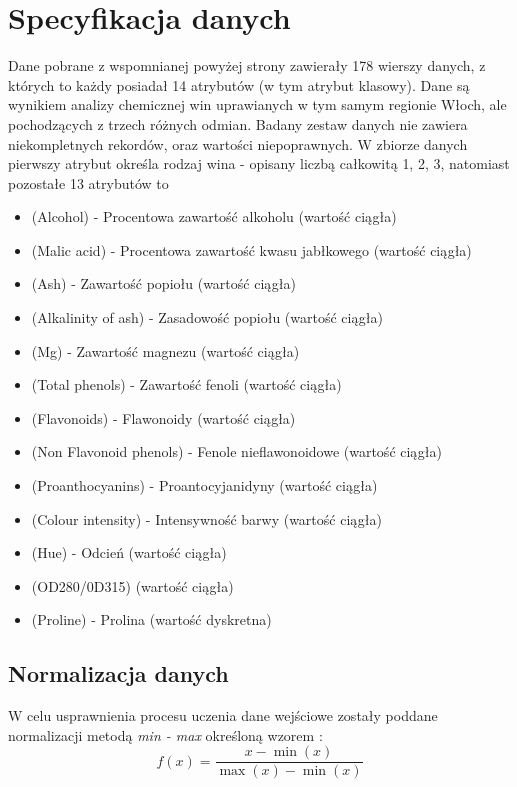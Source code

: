 \documentclass[12pt,twoside]{article}
\begin{document}
\section{Specyfikacja danych}
Dane pobrane z wspomnianej powyżej strony zawierały 178 wierszy danych, z których to każdy posiadał 14 atrybutów (w tym atrybut klasowy). Dane
są wynikiem analizy chemicznej win uprawianych w tym samym regionie Włoch,
ale pochodzących z trzech różnych odmian. Badany zestaw danych nie zawiera
niekompletnych rekordów, oraz wartości niepoprawnych. W zbiorze danych pierwszy
atrybut określa rodzaj wina - opisany liczbą całkowitą {1, 2, 3}, natomiast pozostałe
13 atrybutów to
\begin{itemize}
\item (Alcohol) - Procentowa zawartość alkoholu (wartość ciągła)
\item (Malic acid) - Procentowa zawartość kwasu jabłkowego (wartość ciągła)
\item (Ash) - Zawartość popiołu (wartość ciągła)
\item (Alkalinity of ash) - Zasadowość popiołu (wartość ciągła)
\item (Mg) - Zawartość magnezu (wartość ciągła)
\item (Total phenols) - Zawartość fenoli (wartość ciągła)
\item (Flavonoids) - Flawonoidy (wartość ciągła)
\item (Non Flavonoid phenols) - Fenole nieflawonoidowe (wartość ciągła)
\item (Proanthocyanins) - Proantocyjanidyny (wartość ciągła)
\item (Colour intensity) - Intensywność barwy (wartość ciągła)
\item (Hue) - Odcień (wartość ciągła)
\item (OD280/0D315) (wartość ciągła)
\item (Proline) - Prolina (wartość dyskretna)
\end{itemize}
\clearpage

\subsection{Normalizacja danych}
W celu usprawnienia procesu uczenia dane wejściowe zostały poddane normalizacji metodą \textit{min - max} określoną wzorem \cite{norm}:
\begin{equation}
f(x) = \frac{x - \min{(x)}}{\max{(x)} - \min{(x)}}
\end{equation}
\end{document}
